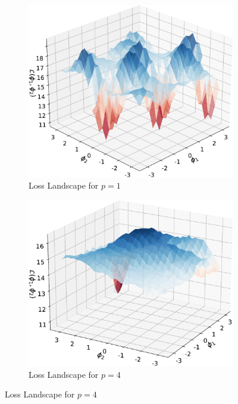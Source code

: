 \documentclass[%
 reprint,
 amsmath,
 amssymb,
 showkeys,
 pra,
 floatfix,
]{revtex4-2}
\begin{document}
\begin{figure}[htp]
    \centering
    \begin{subfigure}[b]{0.32\linewidth}
        \includegraphics[width=\textwidth]{images/loss_landscape_p1.pdf}
        \caption{Loss Landscape for $p=1$\label{fig:loss-p1}}
    \end{subfigure}
    \begin{subfigure}[b]{0.32\linewidth}
        \includegraphics[width=\textwidth]{images/loss_landscape_p2.pdf}
        \caption{Loss Landscape for $p=4$\label{fig:loss-p4}}

\end{subfigure}
\end{figure}
\end{document}
